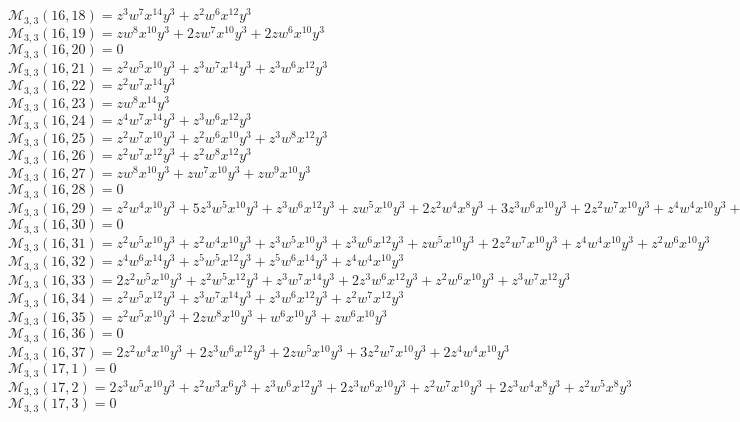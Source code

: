 $\mathcal{M}_{3,3}(16,18)=z^3w^7x^{14}y^3+z^2w^6x^{12}y^3$\\
$\mathcal{M}_{3,3}(16,19)=zw^8x^{10}y^3+2zw^7x^{10}y^3+2zw^6x^{10}y^3$\\
$\mathcal{M}_{3,3}(16,20)=0$\\
$\mathcal{M}_{3,3}(16,21)=z^2w^5x^{10}y^3+z^3w^7x^{14}y^3+z^3w^6x^{12}y^3$\\
$\mathcal{M}_{3,3}(16,22)=z^2w^7x^{14}y^3$\\
$\mathcal{M}_{3,3}(16,23)=zw^8x^{14}y^3$\\
$\mathcal{M}_{3,3}(16,24)=z^4w^7x^{14}y^3+z^3w^6x^{12}y^3$\\
$\mathcal{M}_{3,3}(16,25)=z^2w^7x^{10}y^3+z^2w^6x^{10}y^3+z^3w^8x^{12}y^3$\\
$\mathcal{M}_{3,3}(16,26)=z^2w^7x^{12}y^3+z^2w^8x^{12}y^3$\\
$\mathcal{M}_{3,3}(16,27)=zw^8x^{10}y^3+zw^7x^{10}y^3+zw^9x^{10}y^3$\\
$\mathcal{M}_{3,3}(16,28)=0$\\
$\mathcal{M}_{3,3}(16,29)=z^2w^4x^{10}y^3+5z^3w^5x^{10}y^3+z^3w^6x^{12}y^3+zw^5x^{10}y^3+2z^2w^4x^8y^3+3z^3w^6x^{10}y^3+2z^2w^7x^{10}y^3+z^4w^4x^{10}y^3+z^2w^5x^8y^3$\\
$\mathcal{M}_{3,3}(16,30)=0$\\
$\mathcal{M}_{3,3}(16,31)=z^2w^5x^{10}y^3+z^2w^4x^{10}y^3+z^3w^5x^{10}y^3+z^3w^6x^{12}y^3+zw^5x^{10}y^3+2z^2w^7x^{10}y^3+z^4w^4x^{10}y^3+z^2w^6x^{10}y^3$\\
$\mathcal{M}_{3,3}(16,32)=z^4w^6x^{14}y^3+z^5w^5x^{12}y^3+z^5w^6x^{14}y^3+z^4w^4x^{10}y^3$\\
$\mathcal{M}_{3,3}(16,33)=2z^2w^5x^{10}y^3+z^2w^5x^{12}y^3+z^3w^7x^{14}y^3+2z^3w^6x^{12}y^3+z^2w^6x^{10}y^3+z^3w^7x^{12}y^3$\\
$\mathcal{M}_{3,3}(16,34)=z^2w^5x^{12}y^3+z^3w^7x^{14}y^3+z^3w^6x^{12}y^3+z^2w^7x^{12}y^3$\\
$\mathcal{M}_{3,3}(16,35)=z^2w^5x^{10}y^3+2zw^8x^{10}y^3+w^6x^{10}y^3+zw^6x^{10}y^3$\\
$\mathcal{M}_{3,3}(16,36)=0$\\
$\mathcal{M}_{3,3}(16,37)=2z^2w^4x^{10}y^3+2z^3w^6x^{12}y^3+2zw^5x^{10}y^3+3z^2w^7x^{10}y^3+2z^4w^4x^{10}y^3$\\
$\mathcal{M}_{3,3}(17,1)=0$\\
$\mathcal{M}_{3,3}(17,2)=2z^3w^5x^{10}y^3+z^2w^3x^6y^3+z^3w^6x^{12}y^3+2z^3w^6x^{10}y^3+z^2w^7x^{10}y^3+2z^3w^4x^8y^3+z^2w^5x^8y^3$\\
$\mathcal{M}_{3,3}(17,3)=0$\\
